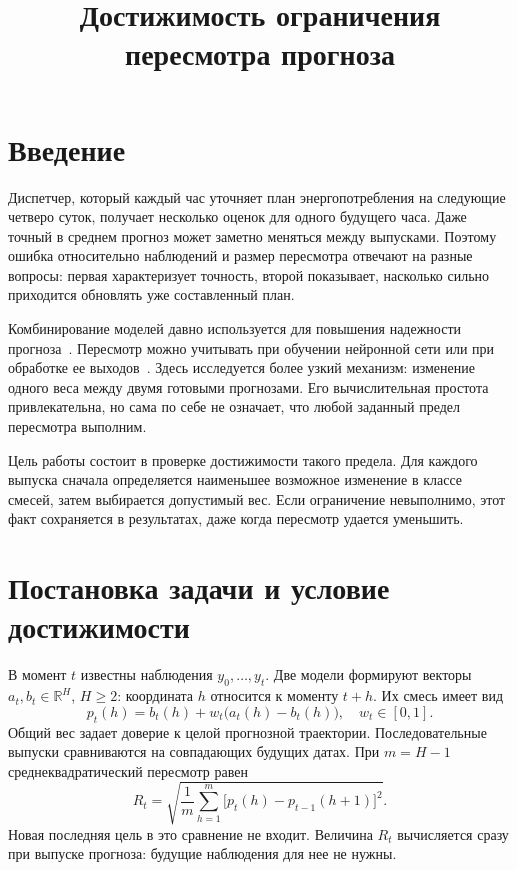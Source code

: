 \documentclass{misisarticle}
\title{Достижимость ограничения пересмотра прогноза}
\begin{document}
\maketitle
{}

\section{Введение}

Диспетчер, который каждый час уточняет план энергопотребления на следующие четверо суток, получает несколько оценок для одного будущего часа. Даже точный в среднем прогноз может заметно меняться между выпусками. Поэтому ошибка относительно наблюдений и размер пересмотра отвечают на разные вопросы: первая характеризует точность, второй показывает, насколько сильно приходится обновлять уже составленный план.

Комбинирование моделей давно используется для повышения надежности прогноза~\cite{bates1969,wang2023}. Пересмотр можно учитывать при обучении нейронной сети или при обработке ее выходов~\cite{vanbelle2023,godahewa2025}. Здесь исследуется более узкий механизм: изменение одного веса между двумя готовыми прогнозами. Его вычислительная простота привлекательна, но сама по себе не означает, что любой заданный предел пересмотра выполним.

Цель работы состоит в проверке достижимости такого предела. Для каждого выпуска сначала определяется наименьшее возможное изменение в классе смесей, затем выбирается допустимый вес. Если ограничение невыполнимо, этот факт сохраняется в результатах, даже когда пересмотр удается уменьшить.

\section{Постановка задачи и условие достижимости}

В момент $t$ известны наблюдения $y_0,\ldots,y_t$. Две модели формируют векторы $a_t,b_t\in\mathbb R^H$, $H\geq2$: координата $h$ относится к моменту $t+h$. Их смесь имеет вид
\begin{equation}
 p_t(h)=b_t(h)+w_t\bigl(a_t(h)-b_t(h)\bigr),
 \quad w_t\in[0,1].
 \label{eq:mixture}
\end{equation}
Общий вес задает доверие к целой прогнозной траектории. Последовательные выпуски сравниваются на совпадающих будущих датах. При $m=H-1$ среднеквадратический пересмотр равен
\begin{equation}
 R_t=\sqrt{\frac1m\sum_{h=1}^{m}
      \bigl[p_t(h)-p_{t-1}(h+1)\bigr]^2}.
 \label{eq:revision}
\end{equation}
Новая последняя цель в это сравнение не входит. Величина $R_t$ вычисляется сразу при выпуске прогноза: будущие наблюдения для нее не нужны.
\end{document}
